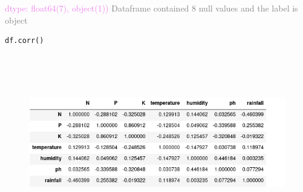\hspace{2in}\textcolor{violet}{dtype: float64(7), object(1))}
\newline
\textcolor{gray}{\hspace{0.5cm}Dataframe contained 8 null values and the label is object}
\begin{lstlisting}[language=Python]
    df.corr()
\end{lstlisting}
\begin{figure}[ht]
    \centering
    \includegraphics[width=7in,height=3in]{corr.png}
    \label{fig:data}
\end{figure}

